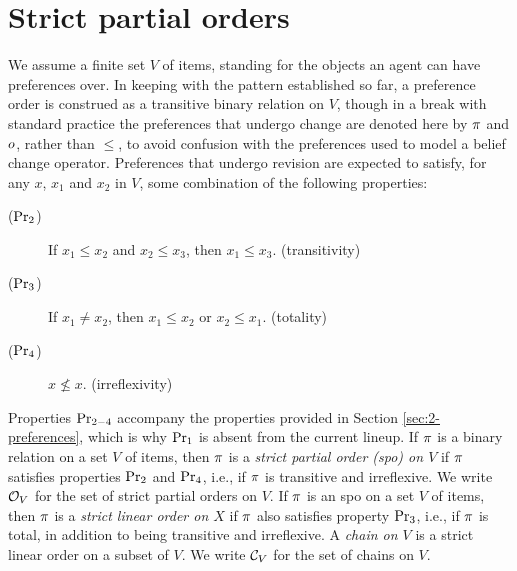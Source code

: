 













\section{Strict partial orders}\label{sec:7-spos}
We assume a finite set $V$ of items, 
standing for the objects an agent can have preferences over.
In keeping with the pattern established so far, 
a preference order is construed as a transitive binary relation on $V$, 
though in a break with standard practice 
the preferences that undergo change are denoted here by 
$\pi$ and $o$, rather than $\le$, to avoid confusion with the 
preferences used to model a belief change operator. 
Preferences that undergo revision are expected to
satisfy, for any $x$, $x_1$ and $x_2$ in $V$,
some combination of the following properties:
\begin{description}
	\item[($\mathrm{Pr}_{2}$)] If $x_1\le x_2$ and $x_2\le x_3$, then $x_1\le x_3$. \hfill(transitivity)
	\item[($\mathrm{Pr}_{3}$)] If $x_1\neq x_2$, 
		then $x_1 \le x_{2}$ or $x_{2} \le x_{1}$. \hfill(totality)
	\item[($\mathrm{Pr}_{4}$)] $x\not\le x$. \hfill(irreflexivity)
\end{description}

Properties $\mathrm{Pr}_{2-4}$ accompany the properties provided in Section \ref{sec:2-preferences},
which is why $\mathrm{Pr}_{1}$ is absent from the current lineup.
If $\pi$ is a binary relation on a set $V$ of items,
then $\pi$ is a \emph{strict partial order (spo) on $V$}
if $\pi$ satisfies properties $\mathrm{Pr}_{2}$ and $\mathrm{Pr}_{4}$,
i.e., if $\pi$ is transitive and irreflexive.
We write $\mathcal{O}_V$ for the set of strict partial orders on $V$.
If $\pi$ is an spo on a set $V$ of items, 
then $\pi$ is a \emph{strict linear order on $X$} if $\pi$
also satisfies property $\mathrm{Pr}_{3}$,
i.e., if $\pi$ is total, in addition to being transitive and irreflexive.
A \emph{chain on $V$} is a strict linear order on a subset of $V$.
We write $\mathcal{C}_V$ for the set of chains on $V$.

